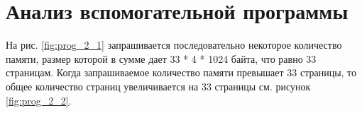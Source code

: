 \begin{figure}[ht!]
\end{figure}

\section{Анализ вспомогательной программы}

На рис. \ref{fig:prog_2_1} запрашивается последовательно некоторое количество памяти,
размер которой в сумме дает 33 * 4 * 1024 байта, что равно 33 страницам.
Когда запрашиваемое количество памяти превышает 33 страницы, то общее 
количество страниц увеличивается на 33 
страницы см. рисунок \ref{fig:prog_2_2}. 

\begin{figure}[ht!]
\end{figure}


